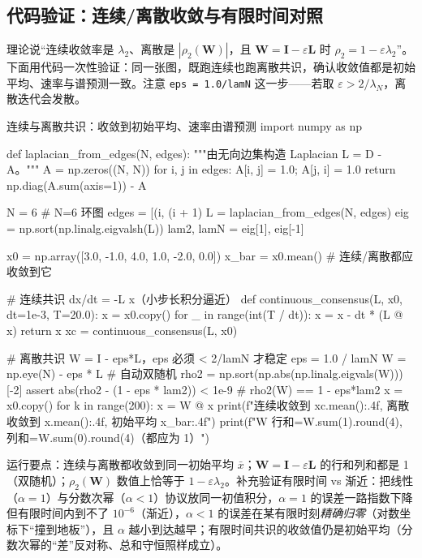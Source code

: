 \subsection{代码验证：连续/离散收敛与有限时间对照}
\label{sec:cs-linear-code}

理论说“连续收敛率是 $\lambda_2$、离散是 $|\rho_2(\mathbf{W})|$，且 $\mathbf{W}=\mathbf{I}-\varepsilon\mathbf{L}$ 时 $\rho_2=1-\varepsilon\lambda_2$”。下面用代码一次性验证：同一张图，既跑连续也跑离散共识，确认收敛值都是初始平均、速率与谱预测一致。注意 \verb|eps = 1.0/lamN| 这一步——若取 $\varepsilon>2/\lambda_N$，离散迭代会发散。

\begin{codebox}[Python]{连续与离散共识：收敛到初始平均、速率由谱预测}
import numpy as np

def laplacian_from_edges(N, edges):
    """由无向边集构造 Laplacian L = D - A。"""
    A = np.zeros((N, N))
    for i, j in edges:
        A[i, j] = 1.0; A[j, i] = 1.0
    return np.diag(A.sum(axis=1)) - A

N = 6                                       # N=6 环图
edges = [(i, (i + 1) %
L = laplacian_from_edges(N, edges)
eig = np.sort(np.linalg.eigvalsh(L))
lam2, lamN = eig[1], eig[-1]

x0 = np.array([3.0, -1.0, 4.0, 1.0, -2.0, 0.0])
x_bar = x0.mean()                           # 连续/离散都应收敛到它

# 连续共识 dx/dt = -L x（小步长积分逼近）
def continuous_consensus(L, x0, dt=1e-3, T=20.0):
    x = x0.copy()
    for _ in range(int(T / dt)):
        x = x - dt * (L @ x)
    return x
xc = continuous_consensus(L, x0)

# 离散共识 W = I - eps*L，eps 必须 < 2/lamN 才稳定
eps = 1.0 / lamN
W = np.eye(N) - eps * L                      # 自动双随机
rho2 = np.sort(np.abs(np.linalg.eigvals(W)))[-2]
assert abs(rho2 - (1 - eps * lam2)) < 1e-9   # rho2(W) == 1 - eps*lam2
x = x0.copy()
for k in range(200):
    x = W @ x
print(f"连续收敛到 {xc.mean():.4f}, 离散收敛到 {x.mean():.4f}, 初始平均 {x_bar:.4f}")
print(f"W 行和={W.sum(1).round(4)}, 列和={W.sum(0).round(4)}（都应为 1）")
\end{codebox}

\noindent 运行要点：连续与离散都收敛到同一初始平均 $\bar x$；$\mathbf{W}=\mathbf{I}-\varepsilon\mathbf{L}$ 的行和列和都是 1（双随机）；$\rho_2(\mathbf{W})$ 数值上恰等于 $1-\varepsilon\lambda_2$。补充验证有限时间 vs 渐近：把线性（$\alpha=1$）与分数次幂（$\alpha<1$）协议放同一初值积分，$\alpha=1$ 的误差一路指数下降但有限时间内到不了 $10^{-6}$（渐近），$\alpha<1$ 的误差在某有限时刻\emph{精确归零}（对数坐标下“撞到地板”），且 $\alpha$ 越小到达越早；有限时间共识的收敛值仍是初始平均（分数次幂的“差”反对称、总和守恒照样成立）。

